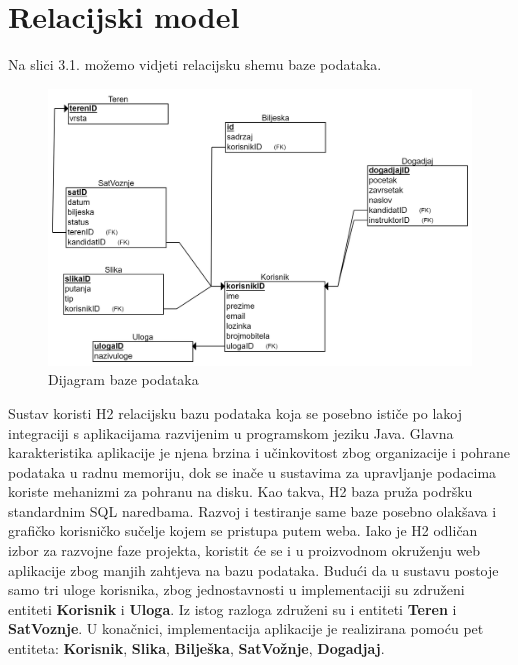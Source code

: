 \section{Relacijski model}


     
Na slici 3.1. možemo vidjeti relacijsku shemu baze podataka. 
\begin{figure}[H]
					\includegraphics[width=\textwidth]{slike/RelBaza.png} 
					\centering
					\caption{Dijagram baze podataka}
					\label{fig:promjene}
				\end{figure}


\noindent Sustav koristi H2 relacijsku bazu podataka koja se posebno ističe po lakoj integraciji s aplikacijama razvijenim u programskom jeziku Java. Glavna karakteristika aplikacije je njena brzina i učinkovitost zbog organizacije i pohrane podataka u radnu memoriju, dok se inače u sustavima za upravljanje podacima koriste mehanizmi za pohranu na disku. Kao takva, H2 baza pruža podršku standardnim SQL naredbama. Razvoj i testiranje same baze posebno olakšava i grafičko korisničko sučelje kojem se pristupa putem weba. Iako je H2 odličan izbor za razvojne faze projekta, koristit će se i u proizvodnom okruženju web aplikacije zbog manjih zahtjeva na bazu podataka. Budući da u sustavu postoje samo tri uloge korisnika, zbog jednostavnosti u implementaciji su združeni entiteti \noindent \textbf{Korisnik} i \noindent \textbf{Uloga}. Iz istog razloga združeni su i entiteti \noindent \textbf{Teren} i \noindent \textbf{SatVoznje}. U konačnici, implementacija aplikacije je realizirana pomoću pet entiteta: \noindent \textbf{Korisnik}, \noindent 
    \textbf{Slika},  \noindent
     \textbf{Bilješka}, \noindent \textbf{SatVožnje}, \noindent \textbf{Dogadjaj}.




